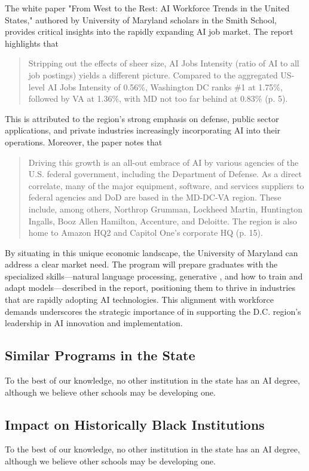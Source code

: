 The white paper "From West to the Rest: AI Workforce Trends in the United States," authored by University of Maryland scholars in the Smith School, provides critical insights into the rapidly expanding AI job market. The report highlights that
\begin{quote}
Stripping out the effects of sheer size, AI Jobs Intensity (ratio of AI to all job postings) yields a different picture. Compared to the aggregated US-level AI Jobs Intensity of 0.56\%, Washington DC ranks \#1 at 1.75\%, followed by VA at 1.36\%, with MD not too far behind at 0.83\% (p. 5).
\end{quote}
This is attributed to the region's strong emphasis on defense, public sector applications, and private industries increasingly incorporating AI into their operations. Moreover, the paper notes that 
\begin{quote}
Driving this growth is an all-out embrace of AI by various agencies of the U.S. federal government, including the Department of Defense. As a direct correlate, many of the major equipment, software, and services suppliers to federal agencies and DoD are based in the MD-DC-VA region. These include, among others, Northrop Grumman, Lockheed Martin, Huntington Ingalls, Booz Allen Hamilton, Accenture, and Deloitte. The region is also home to Amazon HQ2 and Capitol One’s corporate HQ (p. 15).\end{quote}
By situating \short{} in this unique economic landscape, the University of Maryland can address a clear market need. The program will prepare graduates with the specialized skills---natural language processing, generative \ai{}, and how to train and adapt models---described in the report, positioning them to thrive in industries that are rapidly adopting AI technologies. This alignment with workforce demands underscores the strategic importance of \short{} in supporting the D.C. region's leadership in AI innovation and implementation.


\subsection{Similar Programs in the State}

To the best of our knowledge, no other institution in the state has an AI degree, although we believe other schools may be developing one.

\subsection{Impact on Historically Black Institutions}


To the best of our knowledge, no other institution in the state has an AI degree, although we believe other schools may be developing one.